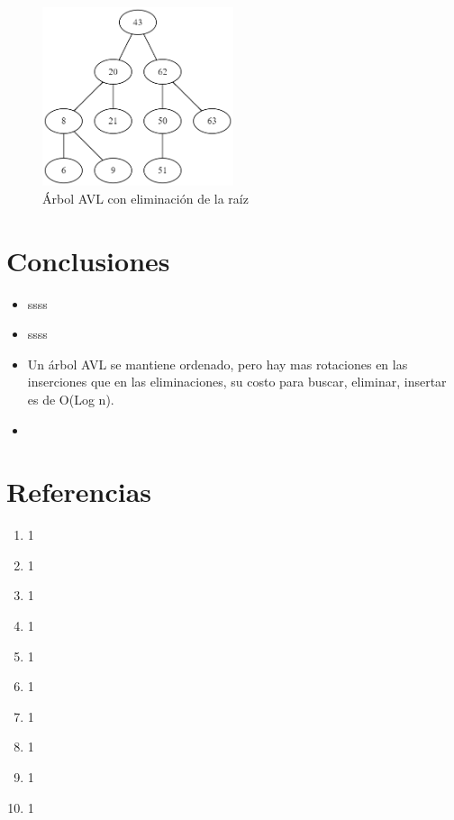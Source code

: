 \documentclass{article}
\begin{document}
             \begin{figure}[htbp]
              \centering
              \includegraphics[width=0.5\textwidth]{img/avltree-deletion-2.png}
              \caption{Árbol AVL con eliminación de la raíz}
              \label{fig:avldelete2}
            \end{figure}

    \section{Conclusiones}
        \begin{itemize}
                 \item  ssss
                 \item	ssss
                 \item Un árbol AVL se mantiene ordenado, pero hay mas rotaciones en las inserciones que en las eliminaciones, su costo para buscar, eliminar, insertar  es de O(Log n).
                 \item  
        \end{itemize}

    \section{Referencias}
  \begin{enumerate}
    \item 1
    \item 1
    \item 1
    \item 1
    \item 1
    \item 1
    \item 1
    \item 1
    \item 1
    \item 1
  \end{enumerate}
\end{document}

